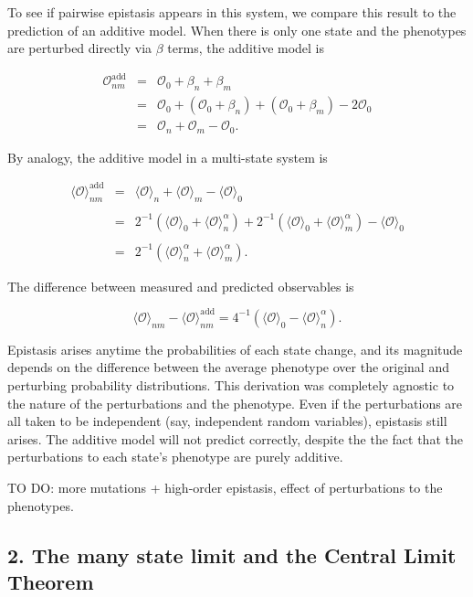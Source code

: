 \documentclass[12pt]{article}
\def\be{\begin{equation}}
\def\ee{\end{equation}}
\def\bea{\begin{eqnarray}}
\def\eea{\end{eqnarray}}
\def\O{\mathcal{O}}
\begin{document}

To see if pairwise epistasis appears in this system, we compare this result to the prediction of an additive model.  When there is only one state and the phenotypes are perturbed directly via $\beta$ terms, the additive model is

\bea
\O^{\text{add}}_{nm} &=& \O_0 + \beta_n + \beta_m \nonumber\\
&=&  \O_0 + (\O_0 + \beta_n) + (\O_0 + \beta_m) - 2\O_0 \nonumber\\
&=& \O_n + \O_m - \O_0.
\eea

\noindent By analogy, the additive model in a multi-state system is

\bea
\langle \O \rangle^{\text{add}}_{nm} &=&  \langle \O \rangle_{n}  + \langle \O \rangle_{m} - \langle \O \rangle_{0}\nonumber\\
&&\nonumber\\
&=& 2^{-1}(\langle \O \rangle_0 + \langle \O \rangle_n^{\alpha}) + 2^{-1}(\langle \O \rangle_0 + \langle \O \rangle_m^{\alpha})  - \langle \O \rangle_{0}\nonumber\\ 
&&\nonumber\\
&=&  2^{-1}(\langle \O \rangle_n^{\alpha} + \langle \O \rangle_m^{\alpha}).
\eea

\noindent The difference between measured and predicted observables is

\be
\langle \O \rangle_{nm} - \langle \O \rangle^{\text{add}}_{nm} = 4^{-1}\left(\langle \O \rangle_{0} - \langle \O \rangle_n^{\alpha}\right).
\ee



Epistasis arises anytime the probabilities of each state change, and its magnitude depends on the difference between the average phenotype over the original and perturbing probability distributions.  This derivation was completely agnostic to the nature of the perturbations and the phenotype.  Even if the perturbations are all taken to be independent (say, independent random variables), epistasis still arises.  The additive model will not predict correctly, despite the the fact that the perturbations to each state's phenotype are purely additive.  

TO DO: more mutations + high-order epistasis, effect of perturbations to the phenotypes.

\subsection*{2. The many state limit and the Central Limit Theorem}
\end{document}
